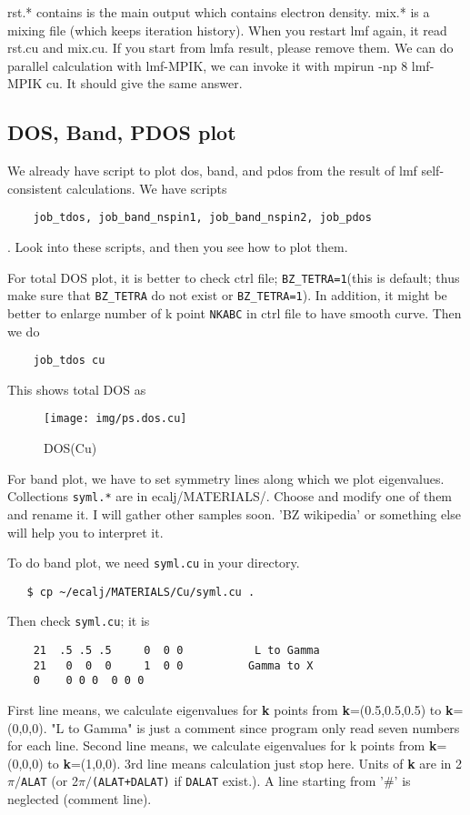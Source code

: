 \documentclass[a4paper,10pt,epsf,fleqn]{article}
\begin{document}
rst.* contains is the main output which contains electron density.
mix.* is a mixing file (which keeps iteration history).
When you restart lmf again, it read rst.cu and mix.cu.
If you start from lmfa result, please remove them.
We can do parallel calculation with lmf-MPIK, 
we can invoke it with mpirun -np 8 lmf-MPIK cu. It should give the
same answer.



\subsection{DOS, Band, PDOS plot}

We already have script to plot dos, band, and pdos
from the result of lmf self-consistent calculations.
We have scripts
\begin{verbatim}
    job_tdos, job_band_nspin1, job_band_nspin2, job_pdos
\end{verbatim}
. Look into these scripts, and then you see how to plot them.

For total DOS plot, it is better to check ctrl file;
\verb+BZ_TETRA=1+(this is default; thus make sure that \verb+BZ_TETRA+ do
not exist or \verb+BZ_TETRA=1+). 
In addition, it might be better to enlarge number of k point
\verb+NKABC+ in ctrl file to have smooth curve. Then we do
\begin{verbatim}
    job_tdos cu
\end{verbatim}
This shows total DOS as
\begin{figure}[h]
 \begin{center}
  \texttt{[image: img/ps.dos.cu]}
  \vspace{5mm}
  \caption{DOS(Cu)}
 \end{center}
\end{figure}
 

For band plot, we have to set symmetry lines along which we plot eigenvalues.
Collections \verb+syml.*+ are in ecalj/MATERIALS/. 
Choose and modify one of them and rename it. 
I will gather other samples soon. 'BZ wikipedia' or something else
will help you to interpret it.

To do band plot, we need \verb+syml.cu+ in your directory.
\begin{verbatim}
   $ cp ~/ecalj/MATERIALS/Cu/syml.cu .
\end{verbatim}
Then check \verb+syml.cu+; it is
\begin{verbatim}
    21  .5 .5 .5     0  0 0           L to Gamma
    21   0  0  0     1  0 0          Gamma to X
    0    0 0 0  0 0 0
\end{verbatim}
First line means, we calculate eigenvalues 
for {\bf k} points from {\bf k}=(0.5,0.5,0.5) to {\bf k}=(0,0,0).
"L to Gamma" is just a comment since program only read 
seven numbers for each line.
Second line means, we calculate eigenvalues 
for k points from {\bf k}=(0,0,0) to {\bf k}=(1,0,0).
3rd line means calculation just stop here.
Units of {\bf k} are in 2$\pi/$\verb+ALAT+ (or 2$\pi/$\verb#(ALAT+DALAT)#
if \verb+DALAT+ exist.).
A line starting from '\#' is neglected (comment line).
\end{document}
